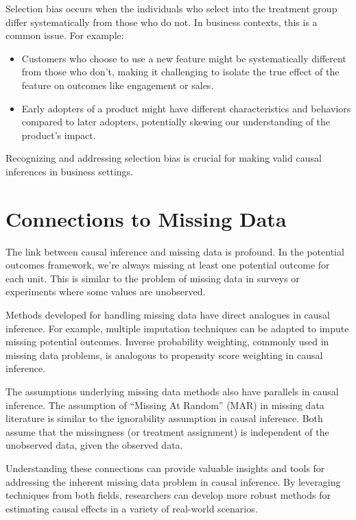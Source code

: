 \documentclass[
  letterpaper,
  DIV=11,
  numbers=noendperiod]{scrreprt}
\providecommand{\tightlist}{%
  \setlength{\itemsep}{0pt}\setlength{\parskip}{0pt}}\usepackage{longtable,booktabs,array}
\begin{document}
Selection bias occurs when the individuals who select into the treatment
group differ systematically from those who do not. In business contexts,
this is a common issue. For example:

\begin{itemize}
\tightlist
\item
  Customers who choose to use a new feature might be systematically
  different from those who don't, making it challenging to isolate the
  true effect of the feature on outcomes like engagement or sales.
\item
  Early adopters of a product might have different characteristics and
  behaviors compared to later adopters, potentially skewing our
  understanding of the product's impact.
\end{itemize}

Recognizing and addressing selection bias is crucial for making valid
causal inferences in business settings.

\section{Connections to Missing Data}\label{connections-to-missing-data}

The link between causal inference and missing data is profound. In the
potential outcomes framework, we're always missing at least one
potential outcome for each unit. This is similar to the problem of
missing data in surveys or experiments where some values are unobserved.

Methods developed for handling missing data have direct analogues in
causal inference. For example, multiple imputation techniques can be
adapted to impute missing potential outcomes. Inverse probability
weighting, commonly used in missing data problems, is analogous to
propensity score weighting in causal inference.

The assumptions underlying missing data methods also have parallels in
causal inference. The assumption of ``Missing At Random'' (MAR) in
missing data literature is similar to the ignorability assumption in
causal inference. Both assume that the missingness (or treatment
assignment) is independent of the unobserved data, given the observed
data.

Understanding these connections can provide valuable insights and tools
for addressing the inherent missing data problem in causal inference. By
leveraging techniques from both fields, researchers can develop more
robust methods for estimating causal effects in a variety of real-world
scenarios.
\end{document}
